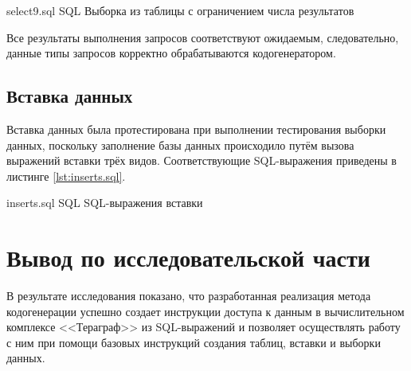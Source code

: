 {select9.sql}
{SQL}
{Выборка из таблицы с ограничением числа результатов}

Все результаты выполнения запросов соответствуют ожидаемым, следовательно, данные типы запросов корректно обрабатываются кодогенератором.

\subsection{Вставка данных}
Вставка данных была протестирована при выполнении тестирования выборки данных, поскольку заполнение базы данных происходило путём вызова выражений вставки трёх видов.
Соответствующие SQL-выражения приведены в листинге \ref{lst:inserts.sql}.

{inserts.sql}
{SQL}
{SQL-выражения вставки}

\section*{Вывод по исследовательской части}
В результате исследования показано, что разработанная реализация метода кодогенерации успешно создает инструкции доступа к данным в вычислительном комплексе <<Тераграф>> из SQL-выражений и позволяет осуществлять работу с ним при помощи базовых инструкций создания таблиц, вставки и выборки данных.